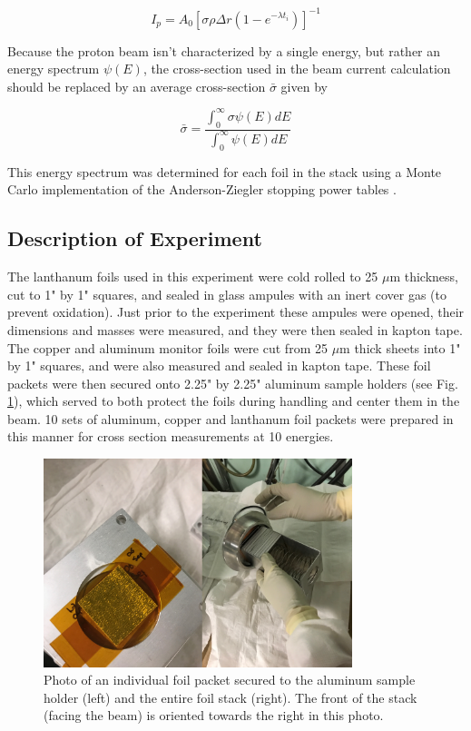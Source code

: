 \documentclass[aps,twocolumn,secnumarabic,balancelastpage,amsmath,amssymb,nofootinbib,floatfix]{revtex4-1}
\begin{document}
\begin{equation}
I_p =  A_0[\sigma \rho \Delta r (1-e^{-\lambda t_i})]^{-1}
\label{eq:beam_current}
\end{equation}

Because the proton beam isn't characterized by a single energy, but rather an energy spectrum $\psi(E)$, the cross-section used in the beam current calculation should be replaced by an average cross-section $\bar{\sigma}$ given by

\begin{equation}
\bar{\sigma} = \frac{\int_0^{\infty}\sigma\psi(E)dE}{\int_0^{\infty}\psi(E)dE}
\label{eq:avg_xs}
\end{equation}

This energy spectrum was determined for each foil in the stack using a Monte Carlo implementation of the Anderson-Ziegler stopping power tables \cite{ZIEGLER20101818}.



\subsection{Description of Experiment}

The lanthanum foils used in this experiment were cold rolled to 25 $\mu$m thickness, cut to 1" by 1" squares, and sealed in glass ampules with an inert cover gas (to prevent oxidation).  Just prior to the experiment these ampules were opened, their dimensions and masses were measured, and they were then sealed in kapton tape.  The copper and aluminum monitor foils were cut from 25 $\mu$m thick sheets into 1" by 1" squares, and were also measured and sealed in kapton tape.  These foil packets were then secured onto 2.25" by 2.25" aluminum sample holders (see Fig. \ref{fig:expt_photos}), which served to both protect the foils during handling and center them in the beam.  10 sets of aluminum, copper and lanthanum foil packets were prepared in this manner for cross section measurements at 10 energies.

\begin{figure}[htb]
\includegraphics[width=9cm]{photos/foil_stack.png}
\caption{Photo of an individual foil packet secured to the aluminum sample holder (left) and the entire foil stack (right).  The front of the stack (facing the beam) is oriented towards the right in this photo.   
}
\label{fig:expt_photos}
\end{figure}
\end{document}
